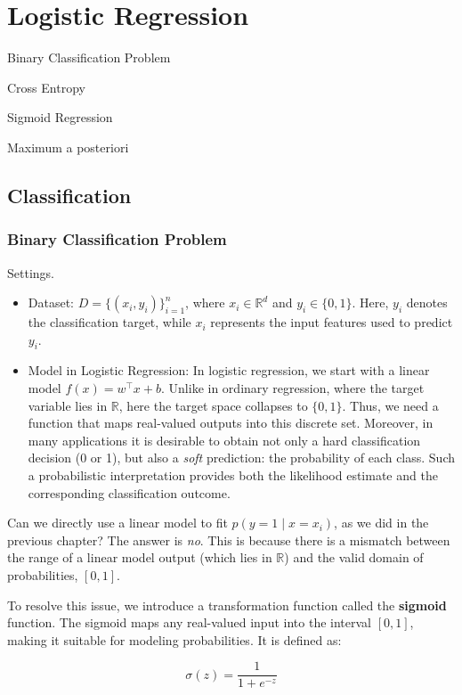 \documentclass[../main]{subfiles}
\begin{document}
\chapter{Logistic Regression}
\begin{introduction}
\item Binary Classification Problem
\item Cross Entropy
\item Sigmoid Regression
\item Maximum a posteriori
\end{introduction}
\section{Classification}

  \subsection{Binary Classification Problem}

Settings.
\begin{itemize}
  \item Dataset: $D=\{(x_i,y_i)\}_{i=1}^n$, where $x_i\in\mathbb{R}^d$ and $y_i\in\{0,1\}$.  
  Here, $y_i$ denotes the classification target, while $x_i$ represents the input features used to predict $y_i$.
  \item Model in Logistic Regression: In logistic regression, we start with a linear model $f(x) = w^\top x + b$.
  Unlike in ordinary regression, where the target variable lies in $\mathbb{R}$, here the target space collapses to $\{0,1\}$. Thus, we need a function that maps real-valued outputs into this discrete set. Moreover, in many applications it is desirable to obtain not only a hard classification decision (0 or 1), but also a \emph{soft} prediction: the probability of each class. Such a probabilistic interpretation provides both the likelihood estimate and the corresponding classification outcome.
\end{itemize}
Can we directly use a linear model to fit $p(y=1 \mid x=x_i)$, as we did in the previous chapter? The answer is \emph{no}. This is because there is a mismatch between the range of a linear model output (which lies in $\mathbb{R}$) and the valid domain of probabilities, $[0,1]$. 

To resolve this issue, we introduce a transformation function called the \textbf{sigmoid} function. The sigmoid maps any real-valued input into the interval $[0,1]$, making it suitable for modeling probabilities. It is defined as:
\begin{definition}
  \begin{equation}
    \sigma(z) = \frac{1}{1 + e^{-z}}
\end{equation}
\end{definition}
\end{document}
